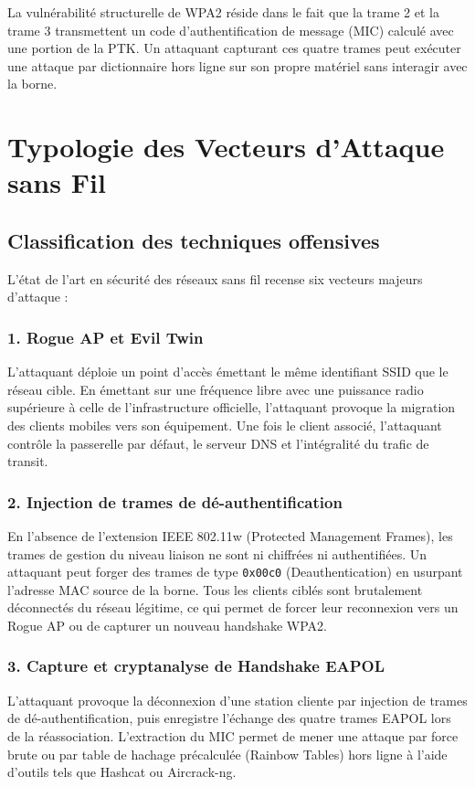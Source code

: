 \documentclass[a4paper,11pt]{article}
\begin{document}
La vulnérabilité structurelle de WPA2 réside dans le fait que la trame 2 et la trame 3 transmettent un code d'authentification de message (MIC) calculé avec une portion de la PTK. Un attaquant capturant ces quatre trames peut exécuter une attaque par dictionnaire hors ligne sur son propre matériel sans interagir avec la borne.

\section{Typologie des Vecteurs d'Attaque sans Fil}

\subsection{Classification des techniques offensives}
L'état de l'art en sécurité des réseaux sans fil recense six vecteurs majeurs d'attaque :

\subsubsection{1. Rogue AP et Evil Twin}
L'attaquant déploie un point d'accès émettant le même identifiant SSID que le réseau cible. En émettant sur une fréquence libre avec une puissance radio supérieure à celle de l'infrastructure officielle, l'attaquant provoque la migration des clients mobiles vers son équipement. Une fois le client associé, l'attaquant contrôle la passerelle par défaut, le serveur DNS et l'intégralité du trafic de transit.

\subsubsection{2. Injection de trames de dé-authentification}
En l'absence de l'extension IEEE 802.11w (Protected Management Frames), les trames de gestion du niveau liaison ne sont ni chiffrées ni authentifiées. Un attaquant peut forger des trames de type \texttt{0x00c0} (Deauthentication) en usurpant l'adresse MAC source de la borne. Tous les clients ciblés sont brutalement déconnectés du réseau légitime, ce qui permet de forcer leur reconnexion vers un Rogue AP ou de capturer un nouveau handshake WPA2.

\subsubsection{3. Capture et cryptanalyse de Handshake EAPOL}
L'attaquant provoque la déconnexion d'une station cliente par injection de trames de dé-authentification, puis enregistre l'échange des quatre trames EAPOL lors de la réassociation. L'extraction du MIC permet de mener une attaque par force brute ou par table de hachage précalculée (Rainbow Tables) hors ligne à l'aide d'outils tels que Hashcat ou Aircrack-ng.
\end{document}
